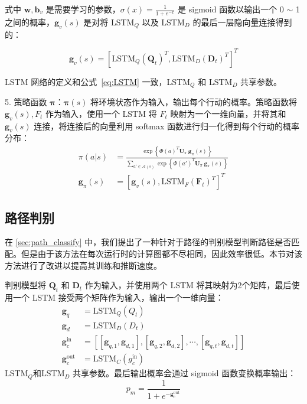 式中 $\mathbf{w}, \mathbf{b}_v$ 是需要学习的参数，$
\sigma(x) = \frac{1}{1+e^{-x}}$ 是 sigmoid 函数以输出一个 0 $\sim$ 1 之间的概率，$\mathbf{g}_v(s)$ 是对将 LSTM$_Q$ 以及 LSTM$_D$ 的最后一层隐向量连接得到的：

\begin{equation}
\mathbf{g}_v(s) = [\mathrm{LSTM}_Q(\mathbf{Q}_t)^T, \mathrm{LSTM}_D(\mathbf{D}_{t})^T]^T
\end{equation}

LSTM 网络的定义和公式~\ref{eq:LSTM} 一致，LSTM$_Q$ 和 LSTM$_D$ 共享参数。

5. 策略函数 $\mathbf{\pi}$：$\mathbf{\pi}(s)$ 将环境状态作为输入，输出每个行动的概率。策略函数将 $\mathbf{g}_v(s), F_t$ 作为输入，使用一个 LSTM 将 $F_t$ 映射为一个一维向量，并将其和 $\mathbf{g}_v(s)$ 连接，将连接后的向量利用 softmax 函数进行归一化得到每个行动的概率分布：
\begin{equation}
\label{eq:MCTS_policy}
\begin{aligned}
\pi(a|s) &= \frac{\exp\left\{\Phi(a)^T \mathbf{U}_\pi ~\mathbf{g}_\pi(s)\right\}}{\sum_{a'\in\mathcal{A}(s)} \exp\left\{\Phi(a')^T \mathbf{U}_\pi ~\mathbf{g}_\pi(s)\right\}} \\
\mathbf{g}_\pi(s) &= [\mathbf{g}_v(s) , \mathrm{LSTM}_F(\mathbf{F}_{t})^T]^T
\end{aligned}
\end{equation}

\subsection{路径判别}
在 \ref{sec:path_classify} 中，我们提出了一种针对于路径的判别模型判断路径是否匹配。但是由于该方法在每次运行时的计算图都不尽相同，因此效率很低。本节对该方法进行了改进以提高其训练和推断速度。

判别模型将 $\mathbf{Q}_t$ 和 $\mathbf{D}_t$ 作为输入，并使用两个 LSTM 将其映射为2个矩阵，最后使用一个 LSTM 接受两个矩阵作为输入，输出一个一维向量：
$$
\begin{aligned}
\mathbf{g}_q &= \mathrm{LSTM}_Q(Q_t)\\
\mathbf{g}_d &= \mathrm{LSTM}_D(D_t)\\
\mathbf{g}_c^{\text{in}} &= [[\mathbf{g}_{q, 1}, \mathbf{g}_{d, 1}], [\mathbf{g}_{q, 2}, \mathbf{g}_{d, 2}], \cdots, [\mathbf{g}_{q, t}, \mathbf{g}_{d, t}]]\\
\mathbf{g}_c^{\text{out}} &= \mathrm{LSTM}_C({g}_c^{\text{in}})
\end{aligned}
$$
LSTM$_Q$和LSTM$_D$ 共享参数。最后输出概率会通过 sigmoid 函数变换概率输出：
\begin{equation}
\label{eq:classification_model}
p_m = \frac{1}{1+e^{-{\mathbf{g}_c^{\text{out}}}}}
\end{equation}

